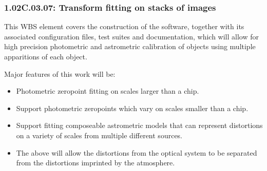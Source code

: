 \subsubsection*{1.02C.03.07: Transform fitting on stacks of images}

This WBS element covers the construction of the software, together with
its associated configuration files, test suites and documentation, which
will allow for high precision photometric and astrometric calibration of
objects using multiple apparitions of each object.

Major features of this work will be:
\begin{itemize}

\item Photometric zeropoint fitting on scales larger than a chip.
\item Support photometric zeropoints which vary on scales smaller than a chip.
\item Support fitting composeable astrometric models that can represent
distortions on a variety of scales from multiple different sources.
\item The above will allow the distortions from the optical system to be
separated from the distortions imprinted by the atmosphere.

\end{itemize}
